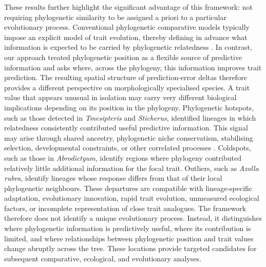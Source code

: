 \documentclass[preprint,12pt,authoryear]{elsarticle}
\begin{document}
These results further highlight the significant advantage of this framework: not requiring phylogenetic similarity to be assigned a priori to a particular evolutionary process. Conventional phylogenetic comparative models typically impose an explicit model of trait evolution, thereby defining in advance what information is expected to be carried by phylogenetic relatedness \citep{laughlin2023plant, revell2022phylogenetic}. In contrast, our approach treated phylogenetic position as a flexible source of predictive information and asks where, across the phylogeny, this information improves trait prediction. The resulting spatial structure of prediction-error deltas therefore provides a different perspective on morphologically specialised species. A trait value that appears unusual in isolation may carry very different biological implications depending on its position in the phylogeny. Phylogenetic hotspots, such as those detected in \textit{Tmesipteris} and \textit{Sticherus}, identified lineages in which relatedness consistently contributed useful predictive information. This signal may arise through shared ancestry, phylogenetic niche conservatism, stabilising selection, developmental constraints, or other correlated processes \citep{westoby2006landplant, westoby2007generalization}. Coldspots, such as those in \textit{Abrodictyum}, identify regions where phylogeny contributed relatively little additional information for the focal trait. Outliers, such as \textit{Azolla rubra}, identify lineages whose response differs from that of their local phylogenetic neighbours. These departures are compatible with lineage-specific adaptation, evolutionary innovation, rapid trait evolution, unmeasured ecological factors, or incomplete representation of close trait analogues. The framework therefore does not identify a unique evolutionary process. Instead, it distinguishes where phylogenetic information is predictively useful, where its contribution is limited, and where relationships between phylogenetic position and trait values change abruptly across the tree. These locations provide targeted candidates for subsequent comparative, ecological, and evolutionary analyses.
\end{document}
